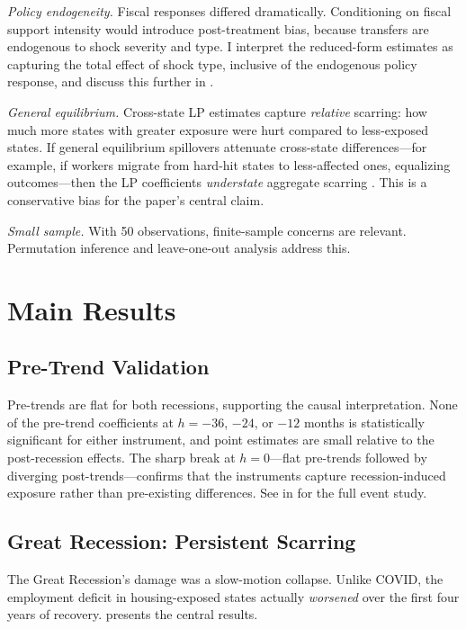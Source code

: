 \documentclass[12pt]{article}
\begin{document}
\textit{Policy endogeneity.} Fiscal responses differed dramatically. Conditioning on fiscal support intensity would introduce post-treatment bias, because transfers are endogenous to shock severity and type. I interpret the reduced-form estimates as capturing the total effect of shock type, inclusive of the endogenous policy response, and discuss this further in .

\textit{General equilibrium.} Cross-state LP estimates capture \textit{relative} scarring: how much more states with greater exposure were hurt compared to less-exposed states. If general equilibrium spillovers attenuate cross-state differences---for example, if workers migrate from hard-hit states to less-affected ones, equalizing outcomes---then the LP coefficients \textit{understate} aggregate scarring \citep{beraja2019geography}. This is a conservative bias for the paper's central claim.

\textit{Small sample.} With 50 observations, finite-sample concerns are relevant. Permutation inference and leave-one-out analysis address this.


\section{Main Results}
\label{sec:results}

\subsection{Pre-Trend Validation}

Pre-trends are flat for both recessions, supporting the causal interpretation. None of the pre-trend coefficients at $h = -36$, $-24$, or $-12$ months is statistically significant for either instrument, and point estimates are small relative to the post-recession effects. The sharp break at $h = 0$---flat pre-trends followed by diverging post-trends---confirms that the instruments capture recession-induced exposure rather than pre-existing differences. See  in  for the full event study.

\subsection{Great Recession: Persistent Scarring}

The Great Recession's damage was a slow-motion collapse. Unlike COVID, the employment deficit in housing-exposed states actually \textit{worsened} over the first four years of recovery.  presents the central results.
\end{document}
